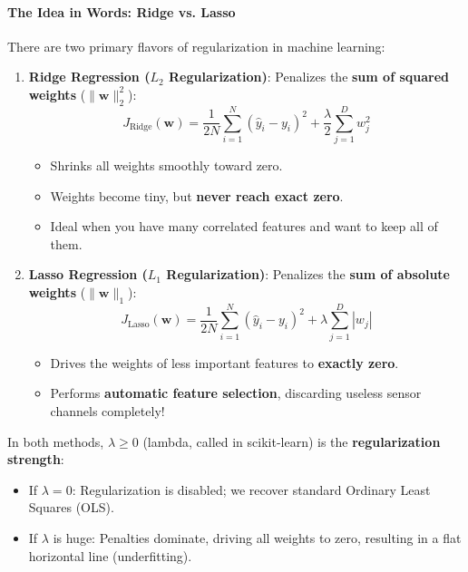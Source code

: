 \paragraph{The Idea in Words: Ridge vs. Lasso}
There are two primary flavors of regularization in machine learning:
\begin{enumerate}
    \item \textbf{Ridge Regression ($L_2$ Regularization)}:
    Penalizes the \textbf{sum of squared weights} ($\|\mathbf{w}\|_2^2$):
    \begin{equation}
    J_{\text{Ridge}}(\mathbf{w}) = \frac{1}{2N} \sum_{i=1}^N (\hat{y}_i - y_i)^2 + \frac{\lambda}{2} \sum_{j=1}^D w_j^2\label{eq:ridge_loss}
    \end{equation}
    \begin{itemize}
        \item Shrinks all weights smoothly toward zero.
        \item Weights become tiny, but \textbf{never reach exact zero}.
        \item Ideal when you have many correlated features and want to keep all of them.
    \end{itemize}

    \item \textbf{Lasso Regression ($L_1$ Regularization)}:
    Penalizes the \textbf{sum of absolute weights} ($\|\mathbf{w}\|_1$):
    \begin{equation}
    J_{\text{Lasso}}(\mathbf{w}) = \frac{1}{2N} \sum_{i=1}^N (\hat{y}_i - y_i)^2 + \lambda \sum_{j=1}^D |w_j|\label{eq:lasso_loss}
    \end{equation}
    \begin{itemize}
        \item Drives the weights of less important features to \textbf{exactly zero}.
        \item Performs \textbf{automatic feature selection}, discarding useless sensor channels completely!
    \end{itemize}
\end{enumerate}
In both methods, $\lambda \ge 0$ (lambda, called  in scikit-learn) is the \textbf{regularization strength}:
\begin{itemize}
    \item If $\lambda = 0$: Regularization is disabled; we recover standard Ordinary Least Squares (OLS).
    \item If $\lambda$ is huge: Penalties dominate, driving all weights to zero, resulting in a flat horizontal line (underfitting).
\end{itemize}

